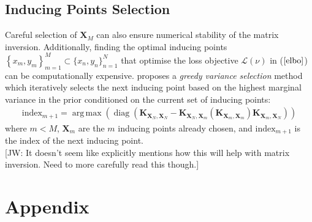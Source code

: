 \documentclass[twoside,11pt]{article}
\newcommand{\jw}[1]{{\color{gray} [JW: #1]}}
\newcommand{\diag}{\operatorname{diag}}
\DeclareMathOperator*{\argmax}{arg\,max}
\begin{document}
\subsection{Inducing Points Selection}
Careful selection of $\mathbf{X}_M$ can also ensure numerical stability of the matrix inversion. Additionally, finding the optimal inducing points $\left\{x_m, y_m\right\}_{m=1}^{M} \subset \{x_n, y_n\}_{n=1}^{N}$ that optimise the loss objective $\mathcal{L}(\nu)$ in ($\ref{elbo}$) can be computationally expensive. \cite{burt2020convergence} proposes a \textit{greedy variance selection} method which iteratively selects the next inducing point based on the highest marginal variance in the prior conditioned on the current set of inducing points:
\begin{align}
    \label{greedy-varaince-selection}
    \text{index}_{m+1} = \argmax \left(\diag \left(\mathbf{K}_{\mathbf{X}_N, \mathbf{X}_N} - \mathbf{K}_{\mathbf{X}_N, \mathbf{X}_{m}} \left(\mathbf{K}_{\mathbf{X}_{m}, \mathbf{X}_{m}} \right) \mathbf{K}_{\mathbf{X}_{m}, \mathbf{X}_N}\right)\right)
\end{align}
where $m < M$, $\mathbf{X}_{m}$ are the $m$ inducing points already chosen, and $\text{index}_{m+1}$ is the index of the next inducing point.
\\\jw{It doesn't seem like \cite{burt2020convergence} explicitly mentions how this will help with matrix inversion. Need to more carefully read this though.}

\section{Appendix}
\end{document}
